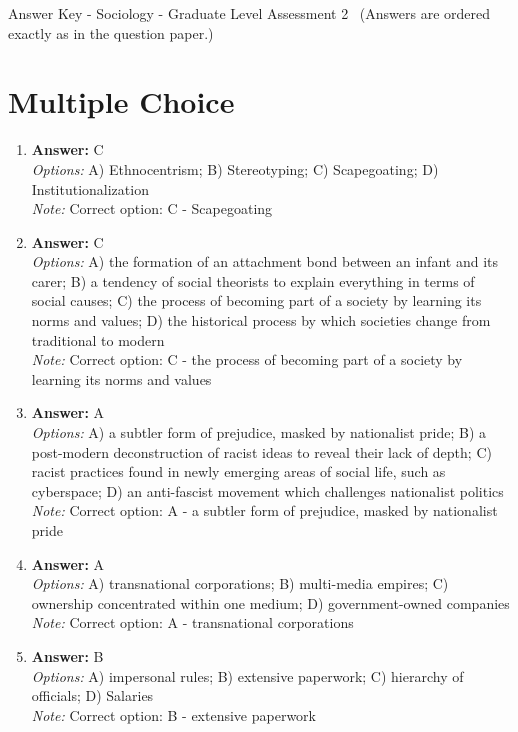 \documentclass[12pt]{article}
\begin{document}
\begin{center}
Answer Key - Sociology - Graduate Level Assessment 2 \
\small (Answers are ordered exactly as in the question paper.)
\end{center}

\section*{Multiple Choice}
\begin{enumerate}[label=\arabic*.]
\item \textbf{Answer:} C
\\ \textit{Options:} A) Ethnocentrism; B) Stereotyping; C) Scapegoating; D) Institutionalization
\\ \textit{Note:} Correct option: C - Scapegoating
\item \textbf{Answer:} C
\\ \textit{Options:} A) the formation of an attachment bond between an infant and its carer; B) a tendency of social theorists to explain everything in terms of social causes; C) the process of becoming part of a society by learning its norms and values; D) the historical process by which societies change from traditional to modern
\\ \textit{Note:} Correct option: C - the process of becoming part of a society by learning its norms and values
\item \textbf{Answer:} A
\\ \textit{Options:} A) a subtler form of prejudice, masked by nationalist pride; B) a post-modern deconstruction of racist ideas to reveal their lack of depth; C) racist practices found in newly emerging areas of social life, such as cyberspace; D) an anti-fascist movement which challenges nationalist politics
\\ \textit{Note:} Correct option: A - a subtler form of prejudice, masked by nationalist pride
\item \textbf{Answer:} A
\\ \textit{Options:} A) transnational corporations; B) multi-media empires; C) ownership concentrated within one medium; D) government-owned companies
\\ \textit{Note:} Correct option: A - transnational corporations
\item \textbf{Answer:} B
\\ \textit{Options:} A) impersonal rules; B) extensive paperwork; C) hierarchy of officials; D) Salaries
\\ \textit{Note:} Correct option: B - extensive paperwork
\end{enumerate}
\end{document}
